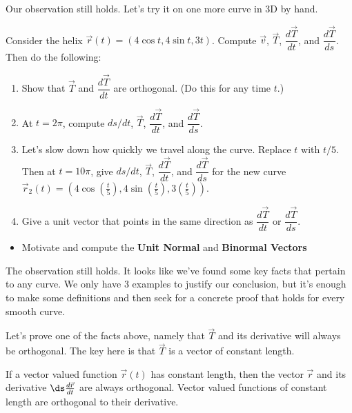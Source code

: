 Our observation still holds.  Let's try it on one more curve in 3D by hand.
\begin{problem}
 Consider the helix $\vec r(t)=(4\cos t,4\sin t, 3t)$.  Compute $\vec v$, $\vec T$, $\dfrac{d\vec T}{dt}$, and $\dfrac{d\vec T}{ds}$. Then do the following:
\begin{enumerate}
 \item Show that $\vec T$ and $\dfrac{d\vec T}{dt}$ are orthogonal. (Do this for any time $t$.)
\item At $t=2\pi$, compute $ds/dt$, $\vec T$, $\dfrac{d\vec T}{dt}$, and $\dfrac{d\vec T}{ds}$.
 \item Let's slow down how quickly we travel along the curve.  Replace $t$ with $t/5$.  Then at $t=10\pi$, give $ds/dt$, $\vec T$, $\dfrac{d\vec T}{dt}$, and $\dfrac{d\vec T}{ds}$ for the new curve $\vec r_2(t) =(4\cos(\frac{t}{5}),4\sin(\frac{t}{5}), 3(\frac{t}{5}))$.
 \item Give a unit vector that points in the same direction as $\dfrac{d\vec T}{dt}$ or $\dfrac{d\vec T}{ds}$.
\end{enumerate}

\end{problem}

\newpage

\uday
\normalsize

\begin{itemize}
\item Motivate and compute the \textbf{Unit Normal} and \textbf{Binormal Vectors} 
\end{itemize}
\vskip0.2in

The observation still holds. It looks like we've found some key facts that pertain to any curve.  We only have 3 examples to justify our conclusion, but it's enough to make some definitions and then seek for a concrete proof that holds for every smooth curve.

Let's prove one of the facts above, namely that $\vec T$ and its derivative will always be orthogonal.  The key here is that $\vec T$ is a vector of constant length.
\begin{theorem}\label{vector valued functions of constant length}
 If a vector valued function $\vec r(t)$ has constant length, then the vector $\vec r$ and its derivative $\ds\frac{d\vec r}{dt}$ are always orthogonal. Vector valued functions of constant length are orthogonal to their derivative.  
\end{theorem}

